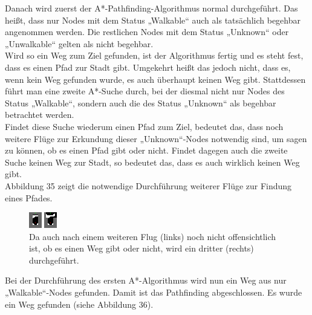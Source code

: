 \documentclass[a4paper,12pt]{article}
\begin{document}
Danach wird zuerst der A*-Pathfinding-Algorithmus normal durchgeführt. Das heißt, dass nur Nodes mit dem Status „Walkable“ auch als tatsächlich begehbar angenommen werden. Die restlichen Nodes mit dem Status „Unknown“ oder „Unwalkable“ gelten als nicht begehbar.
\\[0.4cm]
Wird so ein Weg zum Ziel gefunden, ist der Algorithmus fertig und es steht fest, dass es einen Pfad zur Stadt gibt. Umgekehrt heißt das jedoch nicht, dass es, wenn kein Weg gefunden wurde, es auch überhaupt keinen Weg gibt. Stattdessen führt man eine zweite A*-Suche durch, bei der diesmal nicht nur Nodes des Status „Walkable“, sondern auch die des Status „Unknown“ als begehbar betrachtet werden.
\\[0.4cm]
Findet diese Suche wiederum einen Pfad zum Ziel, bedeutet das, dass noch weitere Flüge zur Erkundung dieser „Unknown“-Nodes notwendig sind, um sagen zu können, ob es einen Pfad gibt oder nicht.
Findet dagegen auch die zweite Suche keinen Weg zur Stadt, so bedeutet das, dass es auch wirklich keinen Weg gibt.
\\[0.4cm]
Abbildung 35 zeigt die notwendige Durchführung weiterer Flüge zur Findung eines Pfades.
\begin{figure}[H]
\centering
    \includegraphics[width=1\linewidth]{Bilder/Aufgabe3/Teilaufgabe_A/Beispiel_03.png}
    \caption{Da auch nach einem weiteren Flug (links) noch nicht offensichtlich ist, ob es einen Weg gibt oder nicht, wird ein dritter (rechts) durchgeführt.}
\end{figure}
Bei der Durchführung des ersten A*-Algorithmus wird nun ein Weg aus nur „Walkable“-Nodes gefunden. Damit ist das Pathfinding abgeschlossen. Es wurde ein Weg gefunden (siehe Abbildung 36).
\end{document}
